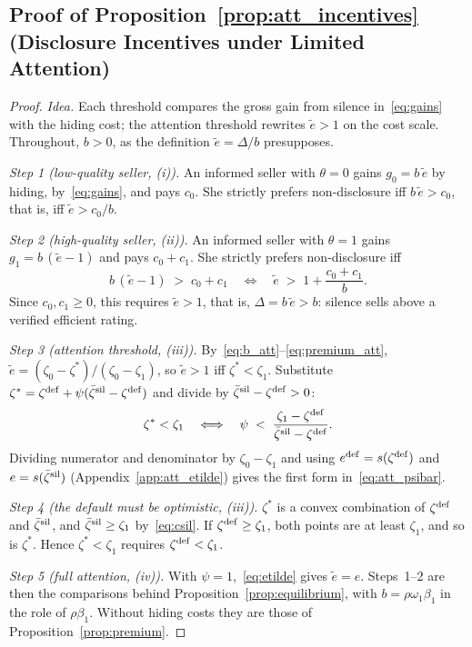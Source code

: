 \subsection*{Proof of Proposition~\ref{prop:att_incentives} (Disclosure Incentives under Limited Attention)}

\begin{proof}\upshape
\emph{Idea.} Each threshold compares the gross gain from silence in~\eqref{eq:gains} with the hiding cost; the attention threshold rewrites $\tilde e>1$ on the cost scale. Throughout, $b>0$, as the definition $\tilde e=\Delta/b$ presupposes.

\emph{Step 1 (low-quality seller, (i)).} An informed seller with $\theta=0$ gains $g_0=b\,\tilde e$ by hiding, by~\eqref{eq:gains}, and pays $c_0$. She strictly prefers non-disclosure iff $b\,\tilde e>c_0$, that is, iff $\tilde e>c_0/b$.

\emph{Step 2 (high-quality seller, (ii)).} An informed seller with $\theta=1$ gains $g_1=b\,(\tilde e-1)$ and pays $c_0+c_1$. She strictly prefers non-disclosure iff
\begin{equation*}
    b\,(\tilde e-1)\;>\;c_0+c_1\quad\Longleftrightarrow\quad\tilde e\;>\;1+\frac{c_0+c_1}{b}.
\end{equation*}
Since $c_0,c_1\ge0$, this requires $\tilde e>1$, that is, $\Delta=b\,\tilde e>b$: silence sells above a verified efficient rating.

\emph{Step 3 (attention threshold, (iii)).} By~\eqref{eq:b_att}--\eqref{eq:premium_att}, $\tilde e=(\zeta_0-\zeta^*)/(\zeta_0-\zeta_1)$, so $\tilde e>1$ iff $\zeta^*<\zeta_1$. Substitute $\zeta^*=\zeta^{\rm def}+\psi(\bar \zeta^{\rm sil}-\zeta^{\rm def})$ and divide by $\bar \zeta^{\rm sil}-\zeta^{\rm def}>0$:
\begin{equation*}
    \zeta^*<\zeta_1\quad\Longleftrightarrow\quad\psi\;<\;\frac{\zeta_1-\zeta^{\rm def}}{\bar \zeta^{\rm sil}-\zeta^{\rm def}}.
\end{equation*}
Dividing numerator and denominator by $\zeta_0-\zeta_1$ and using $e^{\rm def}=s(\zeta^{\rm def})$ and $e=s(\bar \zeta^{\rm sil})$ (Appendix~\ref{app:att_etilde}) gives the first form in~\eqref{eq:att_psibar}.

\emph{Step 4 (the default must be optimistic, (iii)).} $\zeta^*$ is a convex combination of $\zeta^{\rm def}$ and $\bar \zeta^{\rm sil}$, and $\bar \zeta^{\rm sil}\ge \zeta_1$ by~\eqref{eq:csil}. If $\zeta^{\rm def}\ge \zeta_1$, both points are at least $\zeta_1$, and so is $\zeta^*$. Hence $\zeta^*<\zeta_1$ requires $\zeta^{\rm def}<\zeta_1$.

\emph{Step 5 (full attention, (iv)).} With $\psi=1$,~\eqref{eq:etilde} gives $\tilde e=e$. Steps~1--2 are then the comparisons behind Proposition~\ref{prop:equilibrium}, with $b=\rho\omega_1\beta_1$ in the role of $\rho\beta_1$. Without hiding costs they are those of Proposition~\ref{prop:premium}.
\end{proof}

